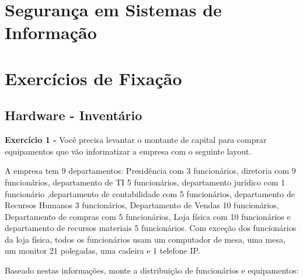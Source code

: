 \documentclass[
]{book}
\begin{document}
\section{Segurança em Sistemas de Informação}\label{seguranuxe7a-em-sistemas-de-informauxe7uxe3o}

\section{Exercícios de Fixação}\label{exercuxedcios-de-fixauxe7uxe3o}

\subsection{Hardware - Inventário}\label{hardware---inventuxe1rio}

\textbf{Exercício 1 -} Você precisa levantar o montante de capital para comprar equipamentos que vão informatizar a empresa com o seguinte layout.

A empresa tem 9 departamentos: Presidência com 3 funcionários, diretoria com 9 funcionários, departamento de TI 5 funcionários, departamento jurídico com 1 funcionário ,departamento de contabilidade com 5 funcionários, departamento de Recursos Humanos 3 funcionários, Departamento de Vendas 10 funcionários, Departamento de compras com 5 funcionários, Loja física com 10 funcionários e departamento de recursos materiais 5 funcionários. Com exceção dos funcionários da loja física, todos os funcionários usam um computador de mesa, uma mesa, um monitor 21 polegadas, uma cadeira e 1 telefone IP.

Baseado nestas informações, monte a distribuição de funcionários e equipamentos:
\end{document}
